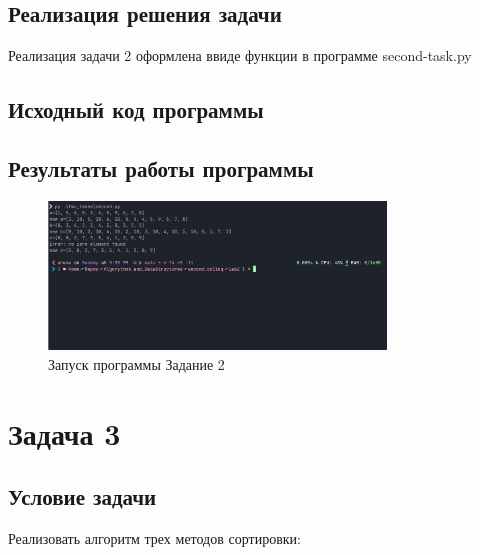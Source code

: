 \subsection{Реализация решения задачи}

Реализация задачи 2 оформлена ввиде функции в программе second-task.py


\subsection{Исходный код программы}



\subsection{Результаты работы программы}

\begin{figure}[H]
    \centering
    \includegraphics[width=0.8\textwidth]{./flowcharts/second_task.png}
    \caption{Запуск программы Задание 2}
\end{figure}




















\section{Задача 3}

\subsection{Условие задачи}


Реализовать алгоритм трех методов сортировки:

